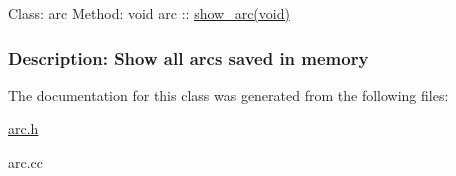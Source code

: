  Class\-: arc Method\-: void arc \-:\-: \hyperlink{classarc_a0d8515bf57d53f2dffdb335c4377d841}{show\-\_\-arc(void)} \subsubsection*{Description\-: Show all arcs saved in memory }

The documentation for this class was generated from the following files\-:\begin{DoxyCompactItemize}
\item 
\hyperlink{arc_8h}{arc.\-h}\item 
arc.\-cc\end{DoxyCompactItemize}
